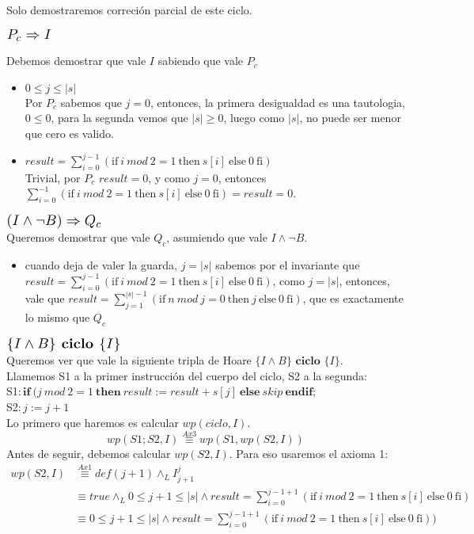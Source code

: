 \documentclass{article}
\begin{document}
\begin{enumerate}[label=\alph*)]
	Solo demostraremos correción parcial de este ciclo.
	\begin{flushleft}$\scalebox{1.3}{$P_c\Rightarrow I$}$\end{flushleft}
	Debemos demostrar que vale $I$ sabiendo que vale $P_c$ 
	\begin{itemize}
		\item $ 0\leq j\leq |s|$\smallskip \\
		Por $P_c$ sabemos que $j=0$, entonces, la primera desigualdad es una tautologia,
		$0\leq 0$, para la segunda vemos que $|s|\geq 0$, luego como 
		$|s|$, no puede ser menor que cero es valido.
		\item  $result=\sum_{i=0}^{j-1}(\textrm{if}\ i\ mod\ 2=1\ \textrm{then}\ s[i]\ \textrm{else}\ 0\ \textrm{fi})$\\
		Trivial, por $P_c$ $result=0$, y  como $j=0$, entonces
		 $\sum_{i=0}^{-1}(\textrm{if}\ i\ mod\ 2=1\ \textrm{then}\ s[i]\ \textrm{else}\ 0\ \textrm{fi})=result=0$.
	\end{itemize}	 
	$\scalebox{1.3}{$(I\wedge \neg B)\Rightarrow Q_c$}$\smallskip \\
	Queremos demostrar que vale $Q_c$, asumiendo que vale  $I\wedge \neg B$.
	\begin{itemize}
	\item cuando deja de valer la guarda, $j=|s|$ sabemos por el invariante que $result=\sum_{i=0}^{j-1}(\textrm{if}\ i\ mod\ 2=1\ \textrm{then}\ s[i]\ \textrm{else}\ 0\ \textrm{fi})$, como $j=|s|$, entonces,
	vale que $result=\sum_{j=1}^{|s|-1}(\textrm{if}\ n\ mod\ j=0\ \textrm{then}\ j\ \textrm{else}\ 0\ \textrm{fi})$, que es exactamente lo mismo que $Q_c$
	\end{itemize}
	$\scalebox{1.3}{$\{I\wedge B\} \textbf{ ciclo } \{I\}$}$\medskip \\
	Queremos ver que vale la siguiente tripla de Hoare $\{I\wedge B\} \textbf{ ciclo } \{I\}$.\\
	Llamemos S1 a la primer instrucción del cuerpo del ciclo, S2 a la segunda:\\
	S1$: \textbf{if}\ (j\ mod\ 2=1\ \textbf{then}\ result:=result+s[j]\ \textbf{else}\ skip\ \textbf{endif};$\\
	S2$: j:=j+1$\\
	Lo primero que haremos es calcular $wp(ciclo,I)$.
	\begin{equation}wp(S1;S2,I)\stackrel{Ax3}{\equiv}wp(S1,wp(S2,I))\end{equation}
	Antes de seguir, debemos calcular $wp(S2,I)$. Para eso usaremos el axioma 1:
	\begin{align*}
	wp(S2,I)&\stackrel{Ax1}{\equiv}def(j+1)\wedge_L I_{j+1}^{j}\\
		&\equiv true\wedge_L 0\leq j+1\leq |s| \wedge result=\sum_{i=0}^{j-1+1}(\textrm{if}\ i\ mod\ 2=1\ \textrm{then}\ s[i]\ \textrm{else}\ 0\ \textrm{fi})\\
		&\equiv 0\leq j+1\leq |s| \wedge result=\sum_{i=0}^{j-1+1}(\textrm{if}\ i\ mod\ 2=1\ \textrm{then}\ s[i]\ \textrm{else}\ 0\ \textrm{fi}))
	\end{align*}
	

\end{enumerate}
\end{document}
